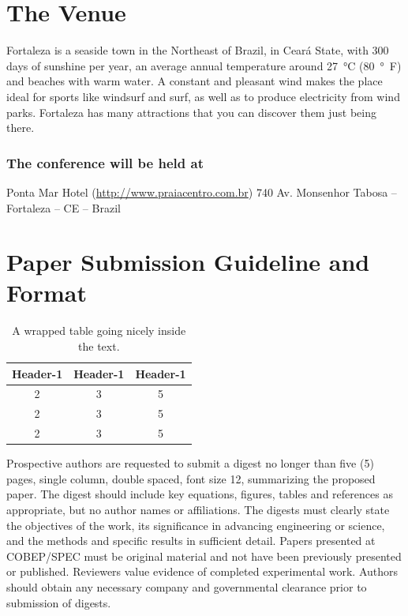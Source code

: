 \documentclass[a4paper,oneside,onecolumn,draftcls,12pt,conference]{IEEEtran}
\begin{document}
\section{The Venue}




Fortaleza is a seaside town in the Northeast of Brazil, in Ceará State, with 300 days of sunshine per year, an average annual temperature around \SI{27}{\degreeCelsius} (\SI{80}{\degree F}) and beaches with warm water. A constant and pleasant wind makes the place ideal for sports like windsurf and surf, as well as to produce electricity from wind parks. Fortaleza has many attractions that you can discover them just being there.



\subsubsection{The conference will be held at}
Ponta Mar Hotel (\url{http://www.praiacentro.com.br}) 740 Av. Monsenhor Tabosa -- Fortaleza -- CE -- Brazil

\section{Paper Submission Guideline and Format}


\begin{table}
	\vspace{-20pt}
	\begin{center}
		\caption{A wrapped table going nicely inside the text.}\label{wrap-tab:1}
		\begin{tabular}{ccc}\\\toprule  
			Header-1 & Header-1 & Header-1 \\\midrule
			2 &3 & 5\\  \midrule
			2 &3 & 5\\  \midrule
			2 &3 & 5\\  \bottomrule
		\end{tabular}
	\end{center}
	\vspace{-20pt}
	\vspace{1pt}
\end{table} 

Prospective authors are requested to submit a digest no longer than five (5) pages, single column, double spaced, font size 12, summarizing the proposed paper. The digest should include key equations, figures, tables and references as appropriate, but no author names or affiliations. The digests must clearly state the objectives of the work, its significance in advancing engineering or science, and the methods and specific results in sufficient detail. Papers presented at COBEP/SPEC must be original material and not have been previously presented or published. Reviewers value evidence of completed experimental work. Authors should obtain any necessary company and governmental clearance prior to submission of digests.
\end{document}

